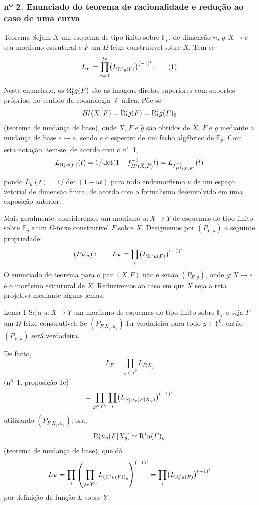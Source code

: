\subsubsection*{n\textsuperscript{o} 2. Enunciado do teorema de racionalidade e redução ao caso de uma curva}

\begin{statement}{Teorema}
Sejam $X$ um esquema de tipo finito sobre $\mathbb F_p$, de dimensão $n$, $g:X\to e$ seu morfismo estrutural e $F$ um $\Omega$-feixe construtível sobre $X$. Tem-se
\[
L_F=\prod_{i=0}^{2n}\bigl(L_{\mathrm{R}^i_!g(F)}\bigr)^{(-1)^i}.
\tag{1}
\]
\end{statement}

Neste enunciado, os $\mathrm{R}^i_!g(F)$ são as imagens diretas superiores com suportes próprios, no sentido da coomologia $\ell$-ádica. Põe-se
\[
H^i_!(\bar X,\bar F)=\mathrm{R}^i_!\bar g(\bar F)=\mathrm{R}^i_!g(F)_{\bar e}
\]
(teorema de mudança de base), onde $\bar X$, $\bar F$ e $\bar g$ são obtidos de $X$, $F$ e $g$ mediante a mudança de base $\bar e\to e$, sendo $\bar e$ o espectro de um fecho algébrico de $\mathbb F_p$. Com esta notação, tem-se, de acordo com o n\textsuperscript{o}~1,
\[
L_{\mathrm{R}^i_!g(F)}(t)=1/\det(1-f^{-1}_{H^i_!(\bar X,\bar F)}t)
 =L_{f^{-1}_{H^i_!(\bar X,\bar F)}}(t)
\]
pondo $L_u(t)=1/\det(1-ut)$ para todo endomorfismo $u$ de um espaço vetorial de dimensão finita, de acordo com o formalismo desenvolvido em uma exposição anterior.

Mais geralmente, consideremos um morfismo $u:X\to Y$ de esquemas de tipo finito sobre $\mathbb F_p$ e um $\Omega$-feixe construtível $F$ sobre $X$. Designemos por $(P_{F,u})$ a seguinte propriedade:
\[
(P_{F,u}):\qquad
L_F=\prod_i\bigl(L_{\mathrm{R}^i_!u(F)}\bigr)^{(-1)^i}.
\]
O enunciado do teorema para o par $(X,F)$ não é senão $(P_{F,g})$, onde $g:X\to e$ é o morfismo estrutural de $X$. Reduziremos ao caso em que $X$ seja a reta projetiva mediante alguns lemas.

\begin{statement}{Lema 1}
Seja $u:X\to Y$ um morfismo de esquemas de tipo finito sobre $\mathbb F_p$ e seja $F$ um $\Omega$-feixe construtível. Se $(P_{F|X_y,u_y})$ for verdadeira para todo $y\in Y^0$, então $(P_{F,u})$ será verdadeira.
\end{statement}

De facto,
\[
L_F=\prod_{y\in Y^0}L_{F|X_y}
\]
(n\textsuperscript{o}~1, proposição 1c)
\[
=\prod_{y\in Y^0}\prod_i\bigl(L_{\mathrm{R}^i_!u_y(F|X_y)}\bigr)^{(-1)^i}
\]
utilizando $(P_{F|X_y,u_y})$; ora,
\[
\mathrm{R}^i_!u_y(F|X_y)\simeq \mathrm{R}^i_!u(F)_y
\]
(teorema de mudança de base), que dá
\[
L_F=\prod_i\left(\prod_{y\in Y^0}L_{(\mathrm{R}^i_!u(F))_y}\right)^{(-1)^i}
=\prod_i\bigl(L_{\mathrm{R}^i_!u(F)}\bigr)^{(-1)^i}
\]
por definição da função $L$ sobre $Y$.

